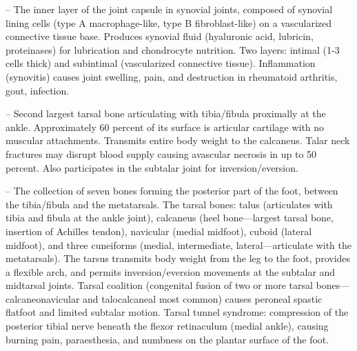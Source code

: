 -- The inner layer of the joint capsule in synovial joints, composed of synovial lining cells (type A macrophage-like, type B fibroblast-like) on a vascularized connective tissue base. Produces synovial fluid (hyaluronic acid, lubricin, proteinases) for lubrication and chondrocyte nutrition. Two layers: intimal (1-3 cells thick) and subintimal (vascularized connective tissue). Inflammation (synovitis) causes joint swelling, pain, and destruction in rheumatoid arthritis, gout, infection.

-- Second largest tarsal bone articulating with tibia/fibula proximally at the ankle. Approximately 60 percent of its surface is articular cartilage with no muscular attachments. Transmits entire body weight to the calcaneus. Talar neck fractures may disrupt blood supply causing avascular necrosis in up to 50 percent. Also participates in the subtalar joint for inversion/eversion.

-- The collection of seven bones forming the posterior part of the foot, between the tibia/fibula and the metatarsals. The tarsal bones: talus (articulates with tibia and fibula at the ankle joint), calcaneus (heel bone—largest tarsal bone, insertion of Achilles tendon), navicular (medial midfoot), cuboid (lateral midfoot), and three cuneiforms (medial, intermediate, lateral—articulate with the metatarsals). The tarsus transmits body weight from the leg to the foot, provides a flexible arch, and permits inversion/eversion movements at the subtalar and midtarsal joints. Tarsal coalition (congenital fusion of two or more tarsal bones—calcaneonavicular and talocalcaneal most common) causes peroneal spastic flatfoot and limited subtalar motion. Tarsal tunnel syndrome: compression of the posterior tibial nerve beneath the flexor retinaculum (medial ankle), causing burning pain, paraesthesia, and numbness on the plantar surface of the foot.

